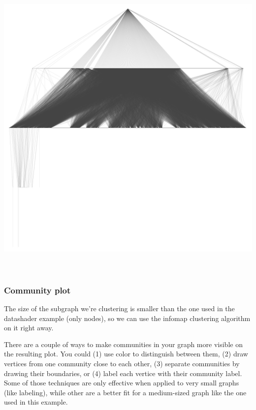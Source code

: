 \documentclass[12pt, a4paper]{article}
\begin{document}
\begin{multicols}{2}
  {\centering
  \includegraphics[width=\columnwidth]{src/youtube/hdg/comp/9_plot_sgy}\\
  \label{fig:hdg_c9}}
  \ \\
  \ \\
\end{multicols}

\subsubsection{Community plot}

The size of the subgraph we're clustering is smaller than the one used in the datashader example (only  nodes), so we can use the infomap clustering algorithm on it right away.



There are a couple of ways to make communities in your graph more visible on the resulting plot. You could (1) use color to distinguish between them, (2) draw vertices from one community close to each other, (3) separate communities by drawing their boundaries, or (4) label each vertice with their community label. Some of those techniques are only effective when applied to very small graphs (like labeling), while other are a better fit for a medium-sized graph like the one used in this example.
\end{document}
